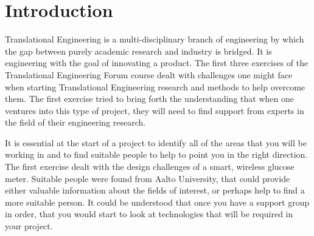 \documentclass[english,12pt,a4paper,pdftex,elec,utf8]{aaltothesis}
\begin{document}

\author{Jan von Steuben 661119 \\ Joseph Hotchkiss 658656}
\date{11.10.2018}


\makecoverpage

\newpage


\cleardoublepage
\storeinipagenumber
{}
\setcounter{page}{1}
\thispagestyle{empty}


\section*{Introduction}

	Translational Engineering is a multi-disciplinary branch of engineering by which the gap between purely academic research and industry is bridged. It is engineering with the goal of innovating a product. The first three exercises of the Translational Engineering Forum course dealt with challenges one might face when starting Translational Engineering research and methods to help overcome them. The first exercise tried to bring forth the understanding that when one ventures into this type of project, they will need to find support from experts in the field of their engineering research.  

	It is essential at the start of a project to identify all of the areas that you will be working in and to find suitable people to help to point you in the right direction. The first exercise dealt with the design challenges of a smart, wireless glucose meter. Suitable people were found from Aalto University, that could provide either valuable information about the fields of interest, or perhaps help to find a more suitable person. It could be understood that once you have a support group in order, that you would start to look at technologies that will be required in your project. 
	
\end{document}
